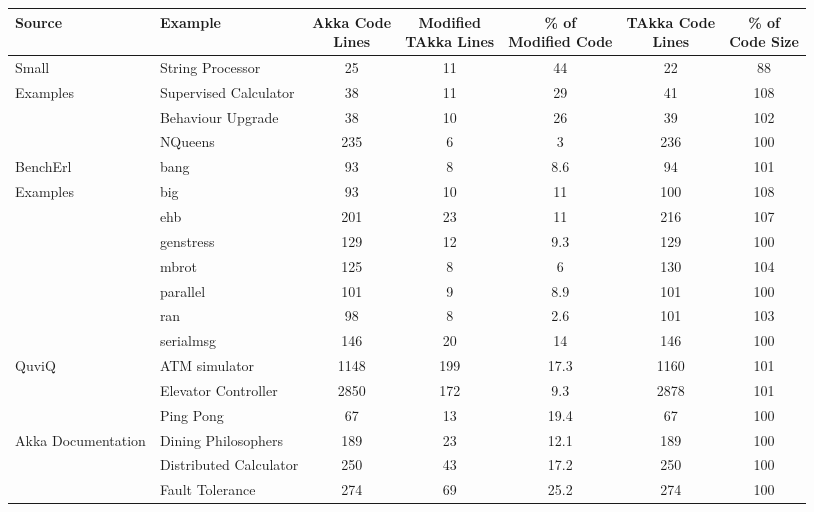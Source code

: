 \begin{table}
\begin{tabular}{| p{4.5 cm} | p{5.6 cm} | c | c |  c | c | c |}
\hline

Source & Example & \specialcell{Akka Code \\ Lines} &
\specialcell{Modified\\ TAkka Lines} & \specialcell{\% of \\Modified Code} &
\specialcell{TAkka Code\\ Lines}
& \specialcell{\% of \\Code Size} \\
\hline
Small   & String Processor & 25 & 11 & 44 & 22 & 88 \\
\cline{2-7}                            
Examples                            & Supervised Calculator &38 & 11 & 29 & 41 & 108 \\ 
\cline{2-7}
                            & Behaviour Upgrade & 38 & 10 & 26 & 39 & 102 \\
\cline{2-7}                            
                            & NQueens & 235 & 6 & 3 & 236 & 100 \\
\cline{2-7}                            
\hline

BenchErl  & bang & 93 & 8 & 8.6 & 94 & 101 \\
\cline{2-7}
Examples                            & big & 93 & 10 & 11 & 100 & 108 \\
\cline{2-7}                            
                            & ehb &201 & 23 & 11 & 216 & 107 \\ 
\cline{2-7}                            
                            & genstress &129 & 12 & 9.3 & 129 & 100 \\ 
\cline{2-7}                            
                            & mbrot & 125 & 8 & 6 & 130 & 104 \\
\cline{2-7}                            
                            & parallel &101 & 9 & 8.9 & 101 & 100 \\ 
\cline{2-7}                            
                            & ran & 98 & 8 & 2.6 & 101 & 103 \\
\cline{2-7}       
                            & serialmsg & 146 & 20 & 14 & 146 & 100 \\
\cline{2-7}       

\hline
QuviQ   & ATM simulator & 1148 & 199 & 17.3 & 1160 & 101 \\
\cline{2-7}
\citep{quviq}    & Elevator Controller & 2850 & 172 & 9.3 & 2878 & 101 \\
\hline
                     & Ping Pong & 67 & 13 & 19.4 & 67 & 100 \\
\cline{2-7}
Akka Documentation   & Dining Philosophers & 189 & 23 & 12.1 & 189 & 100  \\
\cline{2-7}
\citep{akka_doc}     & Distributed Calculator  & 250 & 43 & 17.2 & 250 & 100 \\
\cline{2-7}
                     & Fault Tolerance & 274 & 69 & 25.2 & 274 & 100 \\
\hline


\end{tabular}
\end{table}
